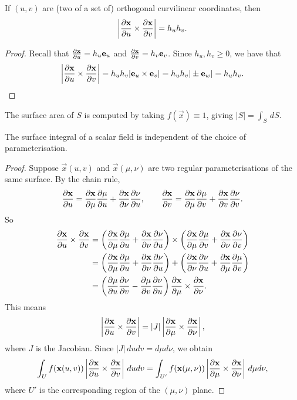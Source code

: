 \documentclass[10pt, a4paper]{article}
\begin{document}
\begin{proposition}
    If $(u, v)$ are
    (two of a set of)
    orthogonal curvilinear coordinates,
    then
    \[
    \left|\pd[\vec{x}]{u} \times \pd[\vec{x}]{v}\right| = h_uh_v.
    \]

    \begin{proof}
        Recall that $\pd[\vec{x}]{u} = h_u\vec{e}_u$ and $\pd[\vec{x}]{v} = h_v\vec{e}_v$.
        Since $h_u, h_v \geq 0$,
        we have that
        \[
        \left|\pd[\vec{x}]{u} \times \pd[\vec{x}]{v}\right| = h_uh_v|\vec{e}_u \times \vec{e}_v| = h_uh_v|\pm\vec{e}_w| = h_uh_v.
        \]
    \end{proof}
\end{proposition}

The surface area of $S$ is computed by taking $f(\vec{x}) \equiv 1$,
giving $|S| = \int_{S}\,dS$.

\begin{proposition}\label{pre:mathmethII:prop:surfintscalindepparam}
    The surface integral of a scalar field is independent of the choice of parameterisation.

    \begin{proof}
        Suppose $\vec{x}(u, v)$ and $\vec{x}(\mu, \nu)$ are two regular parameterisations of the same surface.
        By the chain rule,
        \[
        \pd[\vec{x}]{u} = \pd[\vec{x}]{\mu}\pd[\mu]{u} + \pd[\vec{x}]{\nu}\pd[\nu]{u},\qquad \pd[\vec{x}]{v} = \pd[\vec{x}]{\mu}\pd[\mu]{v} + \pd[\vec{x}]{v}\pd[\nu]{v}.
        \]
        So
        \begin{align*}
            \pd[\vec{x}]{u} \times \pd[\vec{x}]{v} &= \left(\pd[\vec{x}]{\mu}\pd[\mu]{u} + \pd[\vec{x}]{\nu}\pd[\nu]{u}\right) \times \left(\pd[\vec{x}]{\mu}\pd[\mu]{v} + \pd[\vec{x}]{\nu}\pd[\nu]{v}\right) \\
            &= \left(\pd[\vec{x}]{\mu}\pd[\mu]{u} + \pd[\vec{x}]{\nu}\pd[\nu]{u}\right) + \left(\pd[\vec{x}]{\nu}\pd[\nu]{u} + \pd[\vec{x}]{\mu}\pd[\mu]{v}\right) \\
            &= \left(\pd[\mu]{u}\pd[\nu]{v} - \pd[\mu]{v}\pd[\nu]{u}\right)\pd[\vec{x}]{\mu} \times \pd[\vec{x}]{\nu}.
        \end{align*}
        This means
        \[
        \left|\pd[\vec{x}]{u} \times \pd[\vec{x}]{v}\right| = |J|\left|\pd[\vec{x}]{\mu} \times \pd[\vec{x}]{\nu}\right|,
        \]
        where $J$ is the Jacobian.
        Since $|J|\,dudv = d\mu d\nu$,
        we obtain
        \[
        \int_{U}f(\vec{x}(u, v))\left|\pd[\vec{x}]{u} \times \pd[\vec{x}]{v}\right|\,dudv = \int_{U'}f(\vec{x}(\mu, \nu))\left|\pd[\vec{x}]{\mu} \times \pd[\vec{x}]{\nu}\right|\,d\mu d\nu,
        \]
        where $U'$ is the corresponding region of the $(\mu, \nu)$ plane.
    \end{proof}
\end{proposition}
\end{document}
